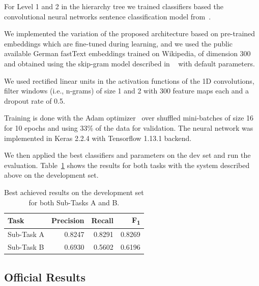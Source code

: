 \documentclass[11pt,a4paper]{article}
\begin{document}
For Level 1 and 2 in the hierarchy tree we trained classifiers based the convolutional
neural networks sentence classification model from~\citet{kim-2014-convolutional}.

We implemented the variation of the proposed architecture based on pre-trained embeddings
which are fine-tuned during learning, and we used the public available German fastText embeddings
trained on Wikipedia, of dimension 300 and obtained using the skip-gram model described in
~\citet{bojanowski-etal-2017-enriching} with default parameters.

We used rectified linear units in the activation functions of the 1D convolutions,
filter windows (i.e., n-grams) of size 1 and 2 with 300 feature maps each and a
dropout rate of 0.5.

Training is done with the Adam optimizer~\cite{journals/corr/KingmaB14} over
shuffled mini-batches of size 16 for 10 epochs and using 33\% of the data for validation.
The neural network was implemented in Keras 2.2.4 with Tensorflow 1.13.1 backend.



We then applied the best classifiers and parameters on the dev set and run the evaluation.
Table~\ref{devset-results} shows the results for both tasks with the system described above on the
development set.

\begin{table}
\begin{center}
\begin{tabular}{|l|r|r|r|}
\hline\centering\textbf{Task}  & \textbf{Precision} &  \textbf{Recall} &  \textbf{F\textsubscript{1}}\\
\hline
 Sub-Task A   & 0.8247 & 0.8291 & 0.8269 \\
 Sub-Task B   & 0.6930 & 0.5602 & 0.6196 \\
\hline
\end{tabular}
\end{center}
\caption{\label{devset-results} Best achieved results on the development set for both Sub-Tasks A and B.}
\end{table}









\subsection{Official Results}
\end{document}
